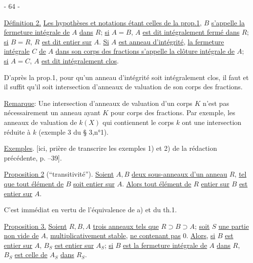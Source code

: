 \begin{center}- 64 -\end{center}

\uline{Définition 2.} \uline{Les hypothèses et notations étant celles de la prop.1}, $B$ \uline{s'appelle la fermeture intégrale de} $A$ \uline{dans} $R$; \uline{si} $A=B$, $A$ \uline{est dit intégralement fermé dans} $R$; \uline{si} $B=R$, $R$ \uline{est dit entier sur} $A$.
\uline{Si} $A$ \uline{est anneau d'intégrité}, \uline{la fermeture intégrale} $C$ \uline{de} $A$ \uline{dans son corps des fractions s'appelle la clôture intégrale de} $A$; \uline{si} $A=C$, $A$ \uline{est dit intégralement clos}.

D'après la prop.1, pour qu'un anneau d'intégrité soit intégralement clos, il faut et il suffit qu'il soit intersection d'anneaux de valuation de son corps des fractions.

\uline{Remarque}: Une intersection d'anneaux de valuation d'un corps $K$ n'est pas nécessairement un anneau ayant $K$ pour corps des fractions. Par exemple, les anneaux de valuation de $k(X)$ qui contiennent le corps $k$ ont une intersection réduite à $k$ (exemple 3 du § 3,n°1).

\uline{Exemples}. [ici, prière de transcrire les exemples 1) et 2) de la rédaction précédente, p. --39].

\uline{Proposition 2} (``transitivité''). \uline{Soient} $A,B$ \uline{deux sous-anneaux d'un anneau} $R$, \uline{tel que tout élément de} $B$ \uline{soit entier sur} $A$. \uline{Alors tout élément de} $R$ \uline{entier sur} $B$ \uline{est entier sur} $A$.

C'est immédiat en vertu de l'équivalence de a) et  du th.1.

\uline{Proposition 3.} \uline{Soient} $R,B,A$ \uline{trois anneaux tels que} $R\supset B\supset A$; \uline{soit} $S$ \uline{une partie non vide de} $A$, \uline{multiplicativement stable}, \uline{ne contenant pas} $0$. \uline{Alors}, \uline{si} $B$ \uline{est entier sur} $A$, $B_S$ \uline{est entier sur} $A_S$; \uline{si} $B$ \uline{est la fermeture intégrale de} $A$ \uline{dans} $R$, $B_S$ \uline{est celle de} $A_S$ \uline{dans} $R_S$.

